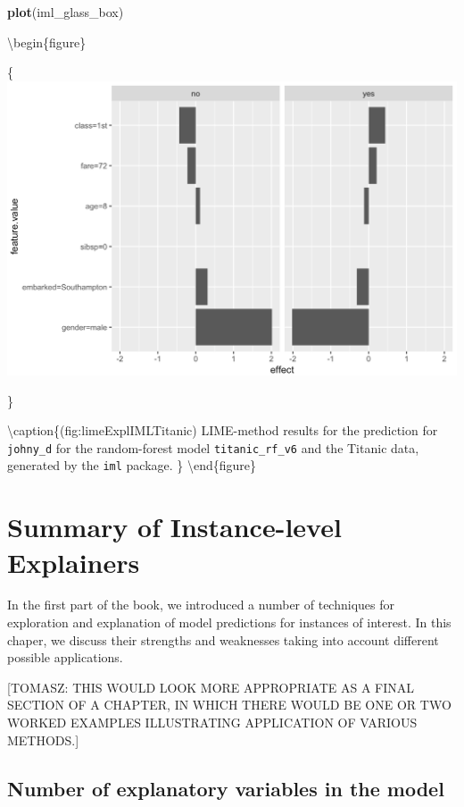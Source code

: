 \documentclass[12pt,]{krantz}
\newenvironment{Shaded}{\begin{snugshade}}{\end{snugshade}}
\newcommand{\KeywordTok}[1]{\textcolor[rgb]{0.13,0.29,0.53}{\textbf{#1}}}
\newcommand{\NormalTok}[1]{#1}
\begin{document}
\begin{Shaded}
\begin{Highlighting}[]
\KeywordTok{plot}\NormalTok{(iml_glass_box) }
\end{Highlighting}
\end{Shaded}

\textbackslash{}begin\{figure\}

\{\centering \includegraphics[width=0.6\linewidth]{figure/lime_expl_iml_titanic}

\}

\textbackslash{}caption\{(fig:limeExplIMLTitanic) LIME-method results for the prediction for \texttt{johny\_d} for the random-forest model \texttt{titanic\_rf\_v6} and the Titanic data, generated by the \texttt{iml} package. \}\label{fig:limeExplIMLTitanic}
\textbackslash{}end\{figure\}

\hypertarget{summaryInstanceLevel}{%
\section{Summary of Instance-level Explainers}\label{summaryInstanceLevel}}

In the first part of the book, we introduced a number of techniques for exploration and explanation of model predictions for instances of interest. In this chaper, we discuss their strengths and weaknesses taking into account different possible applications.

{[}TOMASZ: THIS WOULD LOOK MORE APPROPRIATE AS A FINAL SECTION OF A CHAPTER, IN WHICH THERE WOULD BE ONE OR TWO WORKED EXAMPLES ILLUSTRATING APPLICATION OF VARIOUS METHODS.{]}

\hypertarget{number-of-explanatory-variables-in-the-model}{%
\subsection{Number of explanatory variables in the model}\label{number-of-explanatory-variables-in-the-model}}
\end{document}
